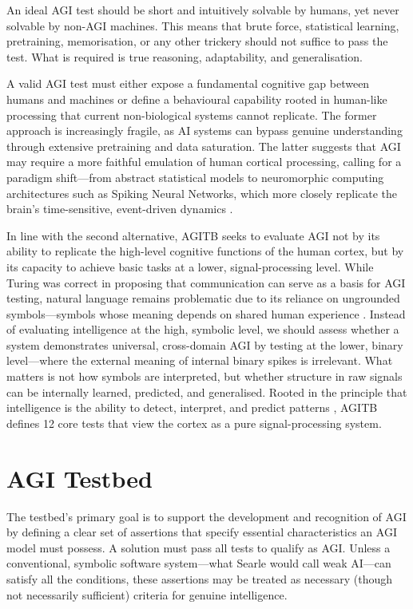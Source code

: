 \documentclass{article}
\begin{document}
An ideal AGI test should be short and intuitively solvable by humans, yet never solvable by non-AGI machines. This means that brute force, statistical learning, pretraining, memorisation, or any other trickery should not suffice to pass the test. What is required is true reasoning, adaptability, and generalisation.

A valid AGI test must either expose a fundamental cognitive gap between humans and machines or define a behavioural capability rooted in human-like processing that current non-biological systems cannot replicate. The former approach is increasingly fragile, as AI systems can bypass genuine understanding through extensive pretraining and data saturation. The latter suggests that AGI may require a more faithful emulation of human cortical processing, calling for a paradigm shift—from abstract statistical models to neuromorphic computing architectures such as Spiking Neural Networks, which more closely replicate the brain's time-sensitive, event-driven dynamics \cite{Maass1997}.

In line with the second alternative, AGITB seeks to evaluate AGI not by its ability to replicate the high-level cognitive functions of the human cortex, but by its capacity to achieve basic tasks at a lower, signal-processing level. While Turing was correct in proposing that communication can serve as a basis for AGI testing, natural language remains problematic due to its reliance on ungrounded symbols—symbols whose meaning depends on shared human experience \cite{Harnad1990}. Instead of evaluating intelligence at the high, symbolic level, we should assess whether a system demonstrates universal, cross-domain AGI by testing at the lower, binary level—where the external meaning of internal binary spikes is irrelevant. What matters is not how symbols are interpreted, but whether structure in raw signals can be internally learned, predicted, and generalised. Rooted in the principle that intelligence is the ability to detect, interpret, and predict patterns \cite{Hawkins2004}, AGITB defines 12 core tests that view the cortex as a pure signal-processing system.



\section{AGI Testbed}

The testbed's primary goal is to support the development and recognition of AGI by defining a clear set of assertions that specify essential characteristics an AGI model must possess. A solution must pass all tests to qualify as AGI. Unless a conventional, symbolic software system—what Searle \cite{Searle1980} would call weak AI—can satisfy all the conditions, these assertions may be treated as necessary (though not necessarily sufficient) criteria for genuine intelligence.
\end{document}

